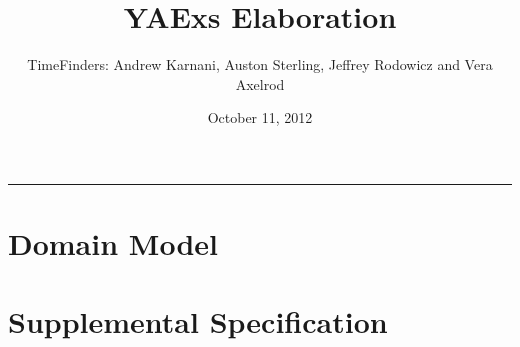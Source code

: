 \documentclass[11pt]{article}
\title{YAExs Elaboration}
\author{TimeFinders: Andrew Karnani, Auston Sterling, Jeffrey Rodowicz and Vera Axelrod}
\date{October 11, 2012}
\begin{document}
\maketitle
\tableofcontents
\vspace{0.2in}
\hrule
\vspace{1in}


\section{Domain Model}

\section{Supplemental Specification}
\end{document}
